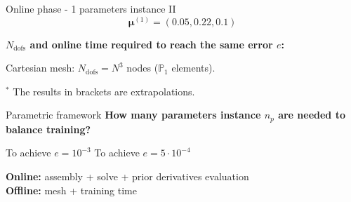\begin{frame}{Online phase - 1 parameters instance II}
	\vspace{-12pt}
	$$\bm{\mu}^{(1)}=(0.05, 0.22, 0.1) $$

	\textbf{$N_\text{dofs}$ and online time required to reach the same error $e$:}

	\begin{table}[ht!]
		\centering
	\end{table}
	\hspace{240pt}

	\begin{minipage}[t]{0.6\linewidth}
		Cartesian mesh: $N_\text{dofs} = N^3$ nodes ($\mathbb{P}_1$ elements).

		\vspace{10pt}
		\footnotesize
		$^*$ The results in brackets are extrapolations.
	\end{minipage} \hfill \begin{minipage}[t]{0.35\linewidth}
		\centering
		
		\vspace{15pt}
		\Large
	\end{minipage}
\end{frame}

\begin{frame}{Parametric framework}
	\textbf{How many parameters instance $n_p$ are needed to balance training?}

	\vspace{-5pt}
	\begin{figure}[H]
		\hspace{-15pt}\begin{minipage}[t]{0.43\linewidth}
			\centering
		\end{minipage} \hspace{20pt}
		\begin{minipage}[t]{0.49\linewidth}
			\centering
		\end{minipage}
	\end{figure}

	\vspace{-15pt}
	\hspace{50pt} To achieve $e=10^{-3}$ \hspace{75pt} To achieve $e=5\cdot 10^{-4}$

	\vspace{10pt}
	\textbf{Online:} assembly + solve \textcolor{addcolor}{\; + prior derivatives evaluation} \\

	\textbf{Offline:} mesh	\textcolor{addcolor}{\; + training time}
\end{frame}